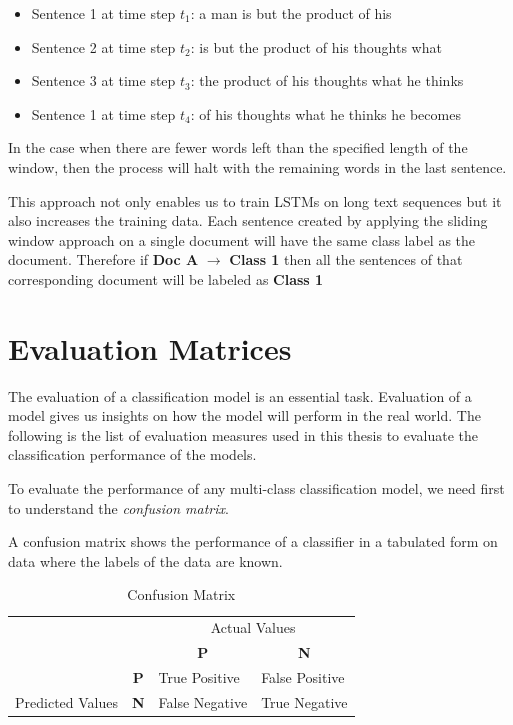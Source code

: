 \begin{itemize}
    \item Sentence 1 at time step $t_{1}$: a man is but the product of his
    \item Sentence 2 at time step $t_{2}$: is but the product of his thoughts what
    \item Sentence 3 at time step $t_{3}$: the product of his thoughts what he thinks
    \item Sentence 1 at time step $t_{4}$: of his thoughts what he thinks he becomes
\end{itemize}

In the case when there are fewer words left than the specified length of the window, then the process will halt with the remaining words in the last sentence.

This approach not only enables us to train \glspl{LSTM} on long text sequences but it also increases the training data. Each sentence created by applying the sliding window approach on a single document will have the same class label as the document. Therefore if  \textbf{Doc A} $\rightarrow$  \textbf{Class 1} then all the sentences of that corresponding document will be labeled as \textbf{Class 1}

\section{Evaluation Matrices}\label{backgroundEvaluationMatrices}

The evaluation of a classification model is an essential task. Evaluation of a model gives us insights on how the model will perform in the real world. The following is the list of evaluation measures used in this thesis to evaluate the classification performance of the models. 

To evaluate the performance of any multi-class classification model, we need first to understand the \textit{confusion matrix}.

A confusion matrix shows the performance of a classifier in a tabulated form on data where the labels of the data are known.

\begin{table}[!ht]
\centering
\begin{tabular}{ll|l|l|}
\cline{3-4}
 &  & \multicolumn{2}{c|}{Actual Values} \\ \cline{3-4} 
 &  & \multicolumn{1}{c|}{\textbf{P}} & \multicolumn{1}{c|}{\textbf{N}} \\ \hline
\multicolumn{1}{|l|}{} & \multicolumn{1}{c|}{\textbf{P}} & True Positive & False Positive \\ \cline{2-4} 
\multicolumn{1}{|l|}{\multirow{-2}{*}{Predicted Values}} & \textbf{N} & False Negative & True Negative \\ \hline
\end{tabular}
 \captionsetup{justification=centering,margin=2cm}
\caption{Confusion Matrix}
\label{table:confMatrix}
\end{table}


